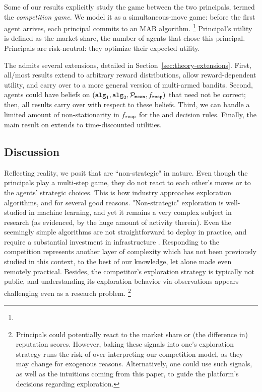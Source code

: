 Some of our results explicitly study the game between the two principals, termed the \emph{competition game}. We model it as a simultaneous-move game: before the first agent arrives, each principal commits to an MAB algorithm.
%
\footnote{}
 Principal's utility is defined as the market share, \ie the number of agents that chose this principal. Principals are risk-neutral: they optimize their expected utility.


 The \TheoryModel admits several extensions, detailed in Section~\ref{sec:theory-extensions}. First, all/most results extend to arbitrary reward distributions, allow reward-dependent utility, and carry over to a more general version of multi-armed bandits. Second, agents could have beliefs on $(\alg[1],\alg[2],\priorMu,\respF)$ that need not be correct; then, all results carry over with respect to these beliefs.
Third, we can handle a limited amount of non-stationarity in $\respF$ for the \HardMaxRandom and \SoftMaxRandom decision rules. Finally, the main result on \HardMax extends to time-discounted utilities.


\subsection{Discussion}
\label{sec:discussion}

Reflecting reality, we posit that  are ``non-strategic" in nature. Even though the principals play a multi-step game, they do not react to each other's moves or to the agents' strategic choices. This is how industry approaches exploration algorithms, and for several good reasons. "Non-strategic" exploration is well-studied in machine learning, and yet it remains a very complex subject in research (as evidenced, \eg by the huge amount of activity therein). Even the seemingly simple algorithms are not straightforward to deploy in practice, and require a substantial investment in infrastructure \cite[\eg see the discussions in][]{DS-arxiv}. Responding to the competition represents another layer of complexity which has not been previously studied in this context, to the best of our knowledge, let alone made even remotely practical. Besides, the competitor's exploration strategy is typically not public, and understanding its exploration behavior via observations appears challenging even as a  research problem.%
\footnote{Principals could potentially react to the market share or (the difference in) reputation scores. However, baking these signals into one's exploration strategy runs the risk of over-interpreting our competition model, as they may change for exogenous reasons. Alternatively, one could use such signals, as well as the intuitions coming from this paper, to guide the platform's decisions regarding exploration.}


